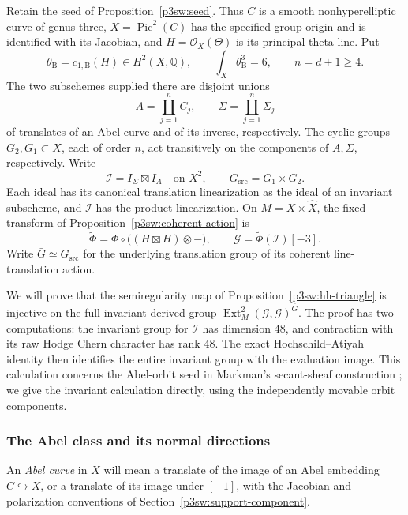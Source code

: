 \documentclass[11pt]{article}
\numberwithin{equation}{section}
\begin{document}
Retain the seed of Proposition~\ref{p3sw:seed}.  Thus \(C\) is a smooth
nonhyperelliptic curve of genus three, \(X=\operatorname{Pic}^2(C)\) has
the specified group origin and is identified with its Jacobian, and
\(H=\mathcal O_X(\Theta)\) is its principal theta line.  Put
\[
 \theta_{\mathrm B}=c_{1,\mathrm B}(H)\in H^2(X,\mathbb Q),
 \qquad \int_X\theta_{\mathrm B}^3=6,\qquad n=d+1\geq4.
\]
The two subschemes supplied there are disjoint unions
\[
 A=\coprod_{j=1}^n C_j,\qquad
 \Sigma=\coprod_{j=1}^n\Sigma_j
\]
of translates of an Abel curve and of its inverse, respectively.  The
cyclic groups \(G_2,G_1\subset X\), each of order \(n\), act transitively
on the components of \(A,\Sigma\), respectively.  Write
\[
 \mathcal I=I_\Sigma\boxtimes I_A\quad\text{on }X^2,\qquad
 G_{\mathrm{src}}=G_1\times G_2.
\]
Each ideal has its canonical translation linearization as the ideal of
an invariant subscheme, and \(\mathcal I\) has the product linearization.
On \(M=X\times\widehat X\), the fixed transform of
Proposition~\ref{p3sw:coherent-action} is
\[
 \widetilde\Phi=\Phi\circ\bigl((H\boxtimes H)\otimes-\bigr),
 \qquad \mathcal G=\widetilde\Phi(\mathcal I)[-3].
\]
Write \(\bar G\simeq G_{\mathrm{src}}\) for the underlying translation
group of its coherent line-translation action.

We will prove that the semiregularity map of
Proposition~\ref{p3sw:hh-triangle} is injective on the full invariant
derived group \(\operatorname{Ext}^2_M(\mathcal G,\mathcal G)^{\bar G}\).
The proof has two computations: the invariant group for \(\mathcal I\)
has dimension \(48\), and contraction with its raw Hodge Chern character
has rank \(48\).  The exact Hochschild--Atiyah identity then identifies
the entire invariant group with the evaluation image.  This calculation
concerns the Abel-orbit seed in Markman's secant-sheaf construction
\cite[Sections~8.3--8.4]{Markman2025Secant}; we give the invariant
calculation directly, using the independently movable orbit components.

\subsubsection{The Abel class and its normal directions}

An \emph{Abel curve} in \(X\) will mean a translate of the image of an
Abel embedding \(C\hookrightarrow X\), or a translate of its image under
\([-1]\), with the Jacobian and polarization conventions of
Section~\ref{p3sw:support-component}.
\end{document}

